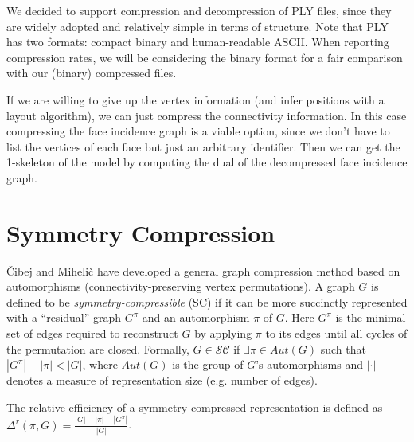 \documentclass{egpubl}
\begin{document}
We decided to support compression and decompression of PLY files, since they are widely adopted and relatively simple in terms of structure.
Note that PLY has two formats: compact binary and human-readable ASCII. When reporting compression rates, we will be considering the binary format for a fair comparison with our (binary) compressed files.

If we are willing to give up the vertex information (and infer positions with a layout algorithm), we can just compress the connectivity information. In this case compressing the face incidence graph is a viable option, since we don't have to list the vertices of each face but just an arbitrary identifier. Then we can get the 1-skeleton of the model by computing the dual of the decompressed face incidence graph.


\section{Symmetry Compression} %

Čibej and Mihelič \cite{cibej2021automorphisms} have developed a general graph compression method based on automorphisms (connectivity-preserving vertex permutations).
A graph $G$ is defined to be \textit{symmetry-compressible} (SC)
if it can be more succinctly represented with a ``residual'' graph $G^\pi$ and an automorphism  $\pi$ of $G$. Here $G^\pi$ is the minimal set of edges required to reconstruct $G$ by applying $\pi$ to its edges until all cycles of the permutation are closed.
Formally, $G \in \mathcal{S}\mathcal{C}$ if $\exists \pi \in Aut(G)$ such that $|G^\pi| + |\pi| < |G|$, where $Aut(G)$ is the group of $G$'s automorphisms and $|\cdot|$ denotes a measure of representation size (e.g. number of edges). 

The relative efficiency of a symmetry-compressed representation is defined as
$\Delta^r(\pi, G) = \frac{|G| - |\pi| - |G^\pi|}{|G|}$.
\end{document}

